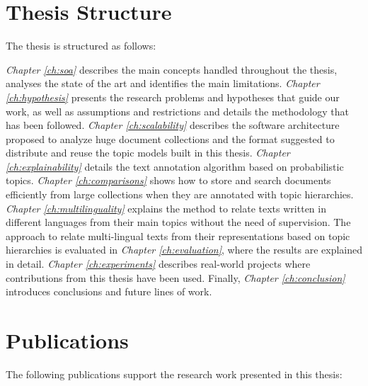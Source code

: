 \section{Thesis Structure}

The thesis is structured as follows:

\textit{Chapter \ref{ch:soa}} describes the main concepts handled throughout the thesis, analyses the state of the art and identifies the main limitations. \textit{Chapter \ref{ch:hypothesis}} presents the research problems and hypotheses that guide our work, as well as assumptions and restrictions and details the methodology that has been followed. \textit{Chapter \ref{ch:scalability}} describes the software architecture proposed to analyze huge document collections and the format suggested to distribute and reuse the topic models built in this thesis. \textit{Chapter \ref{ch:explainability}} details the text annotation algorithm based on probabilistic topics. \textit{Chapter \ref{ch:comparisons}} shows how to store and search documents efficiently from large collections when they are annotated with topic hierarchies.  \textit{Chapter \ref{ch:multilinguality}} explains the method to relate texts written in different languages from their main topics without the need of supervision. The approach to relate multi-lingual texts from their representations based on topic hierarchies is evaluated in \textit{Chapter \ref{ch:evaluation}}, where the results are explained in detail. \textit{Chapter \ref{ch:experiments}} describes real-world projects where contributions from this thesis have been used. Finally, \textit{Chapter \ref{ch:conclusion}} introduces conclusions and future lines of work.


\section{Publications}

The following publications support the research work presented in this thesis:


